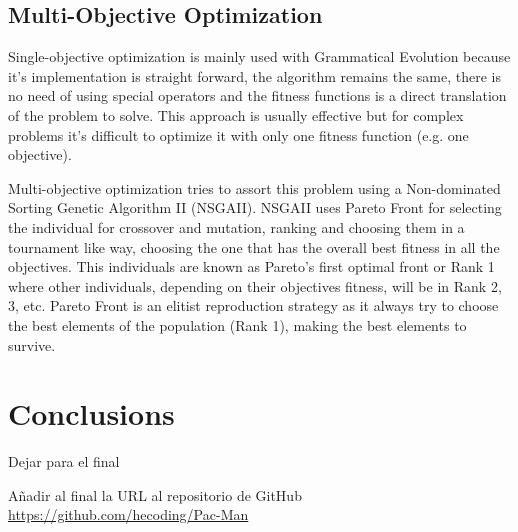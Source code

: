 \documentclass{llncs}
\begin{document}
\subsection{Multi-Objective Optimization}
Single-objective optimization is mainly used with Grammatical Evolution because it's implementation is straight forward, the algorithm remains the same, there is no need of using special operators and the fitness functions is a direct translation of the problem to solve. This approach is usually effective but for complex problems it's difficult to optimize it with only one fitness function (e.g. one objective).

Multi-objective optimization tries to assort this problem using a Non-dominated Sorting Genetic Algorithm II (NSGAII). NSGAII uses Pareto Front %
for selecting the individual for crossover and mutation, ranking and choosing them in a tournament like way, choosing the one that has the overall best fitness in all the objectives. This individuals are known as Pareto's first optimal front or Rank 1 where other individuals, depending on their objectives fitness, will be in Rank 2, 3, etc. Pareto Front is an elitist reproduction strategy as it always try to choose the best elements of the population (Rank 1), making the best elements to survive. %

%
\section{Conclusions}
\label{sec:conclusions}
%


Dejar para el final

Añadir al final la URL al repositorio de GitHub
\url{https://github.com/hecoding/Pac-Man}



\end{document}
